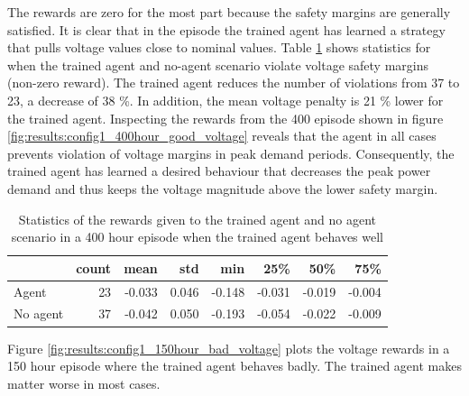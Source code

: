 \documentclass[class=book, crop=false]{standalone}
\begin{document}
The rewards are zero for the most part because the safety margins are generally satisfied. It is clear that in the episode the trained agent has learned a strategy that pulls voltage values close to nominal values. Table \ref{table:results:config1_400hour_good_voltage} shows statistics for when the trained agent and no-agent scenario violate voltage safety margins (non-zero reward). The trained agent reduces the number of violations from 37 to 23, a decrease of 38 \%.  In addition, the mean voltage penalty is 21 \% lower for the trained agent. Inspecting the rewards from the 400 episode shown in figure \ref{fig:results:config1_400hour_good_voltage} reveals that the agent in all cases prevents violation of voltage margins in peak demand periods. Consequently, the trained agent has learned a desired behaviour that decreases the peak power demand and thus keeps the voltage magnitude above the lower safety margin.

\begin{table}[ht]
\center
\begin{tabular}{l|rrrrrrr}
         & count  & mean   & std   & min    & 25\%   & 50\%   & 75\%   \\
\hline
Agent    & 23 & -0.033 & 0.046 & -0.148 & -0.031 & -0.019 & -0.004 \\
No agent & 37 & -0.042 & 0.050 & -0.193 & -0.054 & -0.022 & -0.009 \\
\hline
\end{tabular}
\caption{Statistics of the rewards given to the trained agent and no agent scenario in a 400 hour episode when the trained agent behaves well}
\label{table:results:config1_400hour_good_voltage}
\end{table}

Figure \ref{fig:results:config1_150hour_bad_voltage} plots the voltage rewards in a 150 hour episode where the trained agent behaves badly. The trained agent makes matter worse in most cases.
\end{document}
